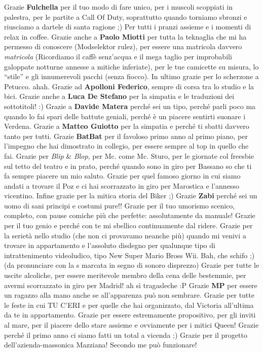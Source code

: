 \documentclass[10pt]{amsart}
\newcommand{\n}[1]{{\Large \bf #1}}
\begin{document}
Grazie \n{Fulchella} per il tuo modo di fare unico, per i muscoli scoppiati in palestra, per le partite a Call Of Duty, soprattutto quando torniamo sbronzi e riusciamo a dartele di santa ragione ;) Per tutti i pranzi assieme e i momenti di relax in coffee.
Grazie anche a \n{Paolo Miotti} per tutta la teknaglia che mi ha permesso di conoscere (Modselektor rulez), per essere una matricola davvero \emph{matricola} (Ricordiamo il caffè senz'acqua e il mega taglio per improbabili galoppate notturne annesse a mitiche inferiate), per le tue camicette su misura, lo ``stile'' e gli innumerevoli pacchi (senza fiocco). In ultimo grazie per lo scherzone a Petucco. ahah.
Grazie ad \n{Apolloni Federico}, sempre di corsa tra lo studio e la bici. Grazie anche a \n{Luca De Stefano} per la simpatia e le traduzioni dei sottotitoli! :) Grazie a \n{Davide Matera} perché sei un tipo, perché parli poco ma quando lo fai spari delle battute geniali, perché è un piacere sentirti suonare i Verdena. 
Grazie a \n{Matteo Guiotto} per la simpatia e perché ti sbatti davvero tanto per tutti.
Grazie \n{BatBat} per il favoloso primo anno al primo piano, per l'impegno che hai dimostrato in collegio, per essere sempre al top in quello che fai. Grazie per \emph{Blip} \& \emph{Blop}, per Mc. come Mc. Sturo, per le giornate col freesbie sul tetto del teatro e in prato, perché quando sono in giro per Bassano so che ti fa sempre piacere un mio saluto. Grazie per quel famoso giorno in cui siamo andati a trovare il Poz e ci hai scorrazzato in giro per Marostica e l'annesso vicentino. Infine grazie per la mitica storia del Biker ;)
Grazie \n{Zabi} perché sei un uomo di sani principi e costumi pure!! Grazie per il tuo umorismo scenico, completo, con pause comiche più che perfette: assolutamente da manuale! Grazie per il tuo genio e perché con te mi sbellico continuamente dal ridere. Grazie per la serietà nello studio (che non ci provavamo neanche più) quando mi venivi a trovare in appartamento e l'assoluto disdegno per qualunque tipo di intrattenimento videoludico, tipo New Super Mario Bross Wii. Bah, che schifo ;) (da pronunciare con la s marcata in segno di sonoro disprezzo) Grazie per tutte le uscite alcoliche, per essere meritevole membro della cena delle bestemmie, per avermi scorrazzato in giro per Madrid! ah sì tragasleche :P
Grazie \n{MP} per essere un ragazzo alla mano anche se all'apparenza può non sembrare. Grazie per tutte le feste in cui TU C'ERI e per quelle che hai organizzato, dal Victoria all'ultima da te in appartamento. Grazie per essere estremamente propositivo, per gli inviti al mare, per il piacere dello stare assieme e ovviamente per i mitici Queen! Grazie perché il primo anno ci siamo fatti un total a vicenda ;) Grazie per il progetto dell'azienda-massonica Mazziana! Secondo me può funzionare!
\end{document}

